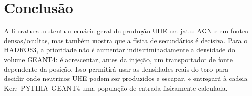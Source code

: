 \documentclass[11pt,a4paper]{article}
\begin{document}
\section{Conclusão}

A literatura sustenta o cenário geral de produção UHE em jatos AGN e em fontes densas/ocultas, mas também mostra que a física de secundários é decisiva. Para o HADROS3, a prioridade não é aumentar indiscriminadamente a densidade do volume GEANT4: é acrescentar, antes da injeção, um transportador de fonte dependente da posição. Isso permitirá usar as densidades reais do toro para decidir onde neutrinos UHE podem ser produzidos e escapar, e entregará à cadeia Kerr--PYTHIA--GEANT4 uma população de entrada fisicamente calculada.



\end{document}
